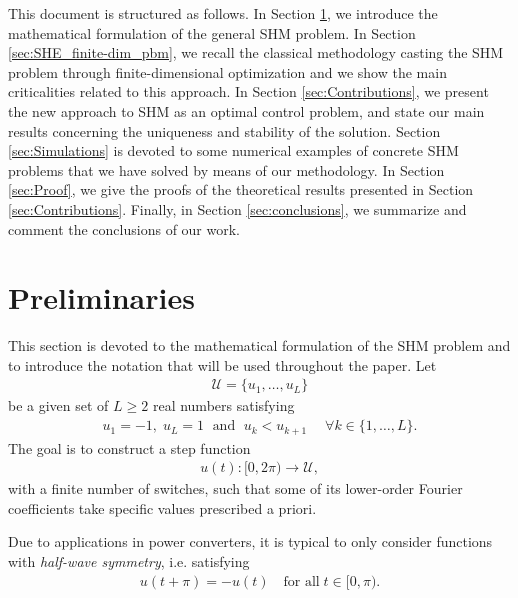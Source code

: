 \documentclass[9pt,shortpaper,twoside,web]{ieeecolor}
\begin{document}
This document is structured as follows. In Section \ref{sec:math_formulation}, we introduce the mathematical formulation of the general SHM problem. 
In Section \ref{sec:SHE_finite-dim_pbm}, we recall the classical methodology casting the SHM problem through finite-dimensional optimization and we show the main criticalities related to this approach. In Section \ref{sec:Contributions}, we present the new approach to SHM  as an optimal control problem, and state our main results concerning the uniqueness and stability of the solution. Section \ref{sec:Simulations} is devoted to some numerical examples of concrete SHM problems that we have solved by means of our methodology. In Section \ref{sec:Proof}, we give the proofs of the theoretical results presented in Section \ref{sec:Contributions}. Finally, in Section \ref{sec:conclusions}, we summarize and comment the conclusions of our work.

\section{Preliminaries}\label{sec:math_formulation}

This section is devoted to the mathematical formulation of the SHM problem and to introduce the notation that will be used throughout the paper. Let 
\begin{align}\label{eq:Udef}
	\mathcal{U} = \{u_1, \ldots, u_L\}
\end{align}
be a given set of $L\geq 2$ real numbers satisfying
\begin{align*}
	u_1 = -1, \; u_L = 1 \;\text{ and } \; u_k<u_{k+1} \quad\; \forall k\in \{1,\ldots, L\}.
\end{align*}
The goal is to construct a step function
\begin{align*}
	u(t):[0,2\pi)\to\mathcal U,
\end{align*}
with a finite number of switches, such that some of its lower-order Fourier coefficients take specific values prescribed a priori.

Due to applications in power converters,  it is typical to only consider functions with \textit{half-wave symmetry}, i.e. satisfying
\begin{align}\label{eq:half-wave symmetry}
	u(t + \pi) = -u(t)\quad \mbox{for all}\; t \in [0,\pi).
\end{align}
\end{document}

